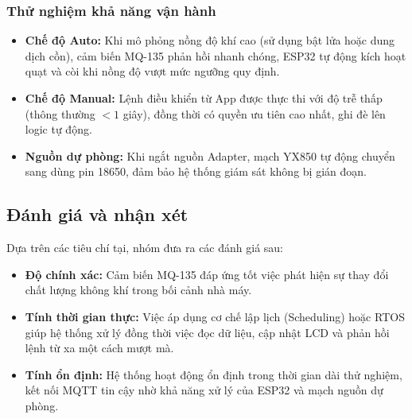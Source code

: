 \documentclass[../BTL_PTIT.tex]{subfiles}
\begin{document}
\subsubsection{Thử nghiệm khả năng vận hành}

\begin{itemize}[label=\textbullet]
    \item \textbf{Chế độ Auto:} Khi mô phỏng nồng độ khí cao (sử dụng bật lửa hoặc dung dịch cồn), cảm biến MQ-135 phản hồi nhanh chóng, ESP32 tự động kích hoạt quạt và còi khi nồng độ vượt mức ngưỡng quy định.
    
    \item \textbf{Chế độ Manual:} Lệnh điều khiển từ App được thực thi với độ trễ thấp (thông thường $< 1$ giây), đồng thời có quyền ưu tiên cao nhất, ghi đè lên logic tự động.
    
    \item \textbf{Nguồn dự phòng:} Khi ngắt nguồn Adapter, mạch YX850 tự động chuyển sang dùng pin 18650, đảm bảo hệ thống giám sát không bị gián đoạn.
\end{itemize}

\subsection{Đánh giá và nhận xét}

Dựa trên các tiêu chí tại, nhóm đưa ra các đánh giá sau:

\begin{itemize}[label=\textbullet]
    \item \textbf{Độ chính xác:} Cảm biến MQ-135 đáp ứng tốt việc phát hiện sự thay đổi chất lượng không khí trong bối cảnh nhà máy.
    
    \item \textbf{Tính thời gian thực:} Việc áp dụng cơ chế lập lịch (Scheduling) hoặc RTOS giúp hệ thống xử lý đồng thời việc đọc dữ liệu, cập nhật LCD và phản hồi lệnh từ xa một cách mượt mà.
    
    \item \textbf{Tính ổn định:} Hệ thống hoạt động ổn định trong thời gian dài thử nghiệm, kết nối MQTT tin cậy nhờ khả năng xử lý của ESP32 và mạch nguồn dự phòng.
\end{itemize}
\end{document}
